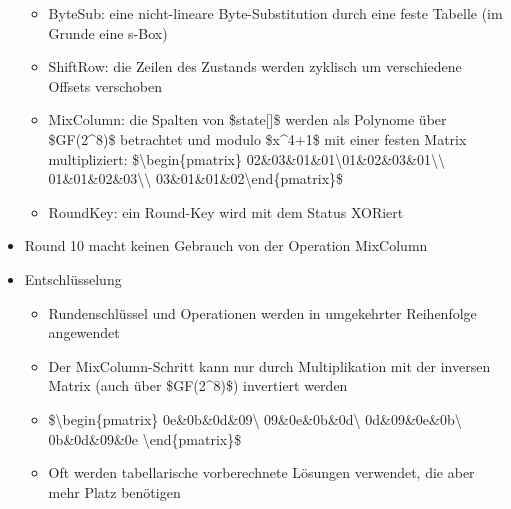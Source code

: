 \documentclass[a4paper]{article}
\begin{document}
\begin{multicols}{3}
\begin{itemize}
              \begin{itemize}
                  \item
                        ByteSub: eine nicht-lineare Byte-Substitution durch eine feste
                        Tabelle (im Grunde eine s-Box)
                  \item
                        ShiftRow: die Zeilen des Zustands werden zyklisch um verschiedene
                        Offsets verschoben
                  \item
                        MixColumn: die Spalten von \$state{[}{]}\$ werden als Polynome über
                        \$GF(2\^{}8)\$ betrachtet und modulo \$x\^{}4+1\$ mit einer festen
                        Matrix multipliziert: \$\textbackslash begin\{pmatrix\}
                        02\&03\&01\&01\textbackslash01\&02\&03\&01\textbackslash\textbackslash{}
                        01\&01\&02\&03\textbackslash\textbackslash{}
                        03\&01\&01\&02\textbackslash end\{pmatrix\}\$
                  \item
                        RoundKey: ein Round-Key wird mit dem Status XORiert
              \end{itemize}
        \item
              Round 10 macht keinen Gebrauch von der Operation MixColumn
    \end{itemize}


    \begin{itemize}
        \item
              Entschlüsselung

              \begin{itemize}
                  \item
                        Rundenschlüssel und Operationen werden in umgekehrter Reihenfolge
                        angewendet
                  \item
                        Der MixColumn-Schritt kann nur durch Multiplikation mit der inversen
                        Matrix (auch über \$GF(2\^{}8)\$) invertiert werden
                  \item
                        \$\textbackslash begin\{pmatrix\} 0e\&0b\&0d\&09\textbackslash{}
                        09\&0e\&0b\&0d\textbackslash{} 0d\&09\&0e\&0b\textbackslash{}
                        0b\&0d\&09\&0e \textbackslash end\{pmatrix\}\$
                  \item
                        Oft werden tabellarische vorberechnete Lösungen verwendet, die aber
                        mehr Platz benötigen
              \end{itemize}
    \end{itemize}



\end{multicols}
\end{document}

